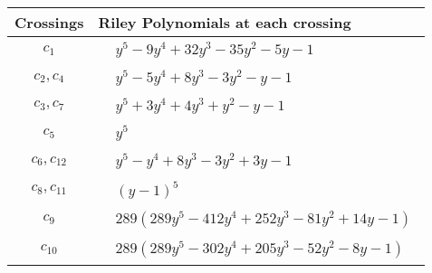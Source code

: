 \documentclass[1p]{elsarticle_modified}
\theoremstyle{definition}
\begin{document}
\begin{tabular}{m{50pt}|m{274pt}}
Crossings & \hspace{64pt}Riley Polynomials at each crossing \\
\hline $$\begin{aligned}c_{1}\end{aligned}$$&$\begin{aligned}
&y^5-9 y^4+32 y^3-35 y^2-5 y-1
\end{aligned}$\\
\hline $$\begin{aligned}c_{2},c_{4}\end{aligned}$$&$\begin{aligned}
&y^5-5 y^4+8 y^3-3 y^2- y-1
\end{aligned}$\\
\hline $$\begin{aligned}c_{3},c_{7}\end{aligned}$$&$\begin{aligned}
&y^5+3 y^4+4 y^3+y^2- y-1
\end{aligned}$\\
\hline $$\begin{aligned}c_{5}\end{aligned}$$&$\begin{aligned}
&y^5
\end{aligned}$\\
\hline $$\begin{aligned}c_{6},c_{12}\end{aligned}$$&$\begin{aligned}
&y^5- y^4+8 y^3-3 y^2+3 y-1
\end{aligned}$\\
\hline $$\begin{aligned}c_{8},c_{11}\end{aligned}$$&$\begin{aligned}
&(y-1)^5
\end{aligned}$\\
\hline $$\begin{aligned}c_{9}\end{aligned}$$&$\begin{aligned}
&289(289 y^5-412 y^4+252 y^3-81 y^2+14 y-1)
\end{aligned}$\\
\hline $$\begin{aligned}c_{10}\end{aligned}$$&$\begin{aligned}
&289(289 y^5-302 y^4+205 y^3-52 y^2-8 y-1)
\end{aligned}$\\
\hline
\end{tabular}\\~\\
\end{document}
